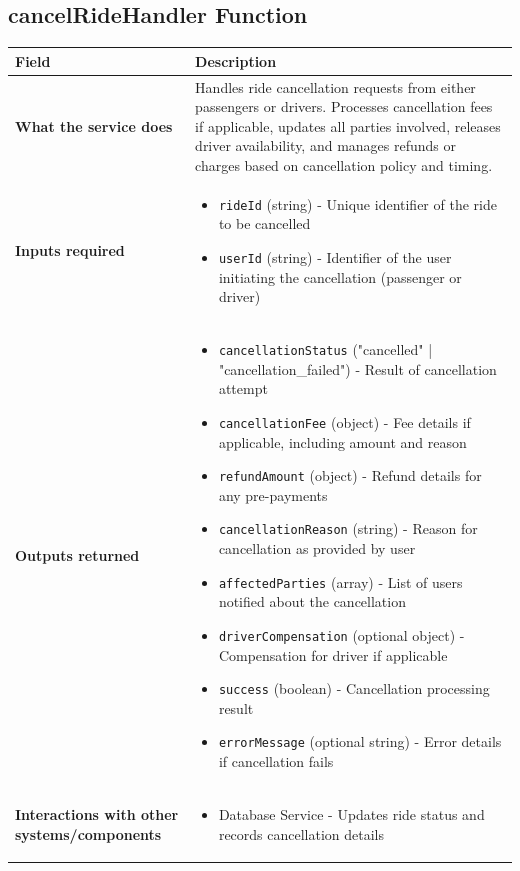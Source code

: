 \documentclass[11pt,a4paper]{article}
\begin{document}
\subsection{cancelRideHandler Function}

\begin{longtable}{|p{4cm}|p{12cm}|}
\hline
\textbf{Field} & \textbf{Description} \\
\hline
\textbf{What the service does} & 
Handles ride cancellation requests from either passengers or drivers. Processes cancellation fees if applicable, updates all parties involved, releases driver availability, and manages refunds or charges based on cancellation policy and timing. \\
\hline
\textbf{Inputs required} & 
\begin{itemize}[nosep]
\item \texttt{rideId} (string) - Unique identifier of the ride to be cancelled
\item \texttt{userId} (string) - Identifier of the user initiating the cancellation (passenger or driver)
\end{itemize} \\
\hline
\textbf{Outputs returned} & 
\begin{itemize}[nosep]
\item \texttt{cancellationStatus} ("cancelled" | "cancellation\_failed") - Result of cancellation attempt
\item \texttt{cancellationFee} (object) - Fee details if applicable, including amount and reason
\item \texttt{refundAmount} (object) - Refund details for any pre-payments
\item \texttt{cancellationReason} (string) - Reason for cancellation as provided by user
\item \texttt{affectedParties} (array) - List of users notified about the cancellation
\item \texttt{driverCompensation} (optional object) - Compensation for driver if applicable
\item \texttt{success} (boolean) - Cancellation processing result
\item \texttt{errorMessage} (optional string) - Error details if cancellation fails
\end{itemize} \\
\hline
\textbf{Interactions with other systems/components} & 
\begin{itemize}[nosep]
\item Database Service - Updates ride status and records cancellation details

\end{itemize}
\end{longtable}
\end{document}

